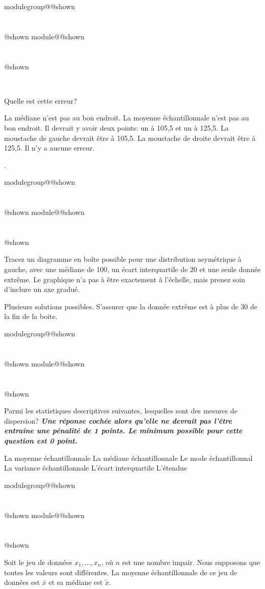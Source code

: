 \documentclass{Evaluation}
\makeatletter
\newcommand{\currentmodulekey}{}
\newcommand{\currentmoduletitle}{}
\newcommand{\currentgroupkey}{}
\newcommand{\currentgrouptitle}{}
\newcommand{\showmoduleifneeded}{%
  \ifx\currentgroupkey\empty\else
    \expandafter\ifx\csname modulegroup@\currentgroupkey @shown\endcsname\relax
      \section*{\currentgrouptitle}%
      \expandafter\gdef\csname modulegroup@\currentgroupkey @shown\endcsname{1}%
    \fi
  \fi
  \expandafter\ifx\csname module@\currentmodulekey @shown\endcsname\relax
    \section*{\currentmoduletitle}%
    \expandafter\gdef\csname module@\currentmodulekey @shown\endcsname{1}%
  \fi
}
\newenvironment{A22}{\showmoduleifneeded}{}
\newenvironment{A23}{\showmoduleifneeded}{}
\newenvironment{A24}{\showmoduleifneeded}{}
\makeatother
\begin{document}
\begin{questions}
\begin{A24}
\begin{center}
\\
	\end{center}

Quelle est cette erreur?

  \begin{checkboxes}
\choice La médiane n'est pas au bon endroit.  
\choice La moyenne échantillonnale n'est pas au bon endroit. 
\choice Il devrait y avoir deux points: un à 105,5 et un à 125,5.
\choice La moustache de gauche devrait être à  105,5. 
\choice La moustache de droite devrait être à 125,5.
\choice Il n'y a aucune erreur.
\end{checkboxes}

.
\end{A24}

\begin{A22}
\question {} %
Tracez un diagramme en boîte possible pour une distribution asymétrique à gauche, avec une médiane de 100, un écart interquartile de 20 et une seule donnée
extrême. Le graphique n'a pas à être exactement à l'échelle, mais prenez soin d'inclure
un axe gradué.

Plusieurs solutions possibles. S'assurer que la donnée extrême est à plus de 30 de la fin de la boite.
\end{A22}

\begin{A23}
\question {} %
Parmi les statistiques descriptives suivantes, lesquelles sont des mesures de dispersion? \textit{\textbf{Une réponse cochée alors qu'elle ne devrait pas l'être entraîne une pénalité de 1 points. Le minimum possible pour cette question est 0 point.}}

\begin{checkboxes}
\choice La moyenne échantillonnale
\choice La médiane échantillonnale
\choice Le mode échantillonnal
\correctchoice La variance échantillonnale
\correctchoice L'écart interquartile
\correctchoice L'étendue
\end{checkboxes}
\end{A23}

\begin{A24}
\question {} %
Soit le jeu de données $x_1,\hdots,x_n$, où $n$ est une nombre impair. Nous supposons que toutes les valeurs sont différentes. La moyenne échantillonnale de ce jeu de données est $\overline{x}$ et sa médiane est $\widetilde{x}$.


\end{A24}
\end{questions}
\end{document}
